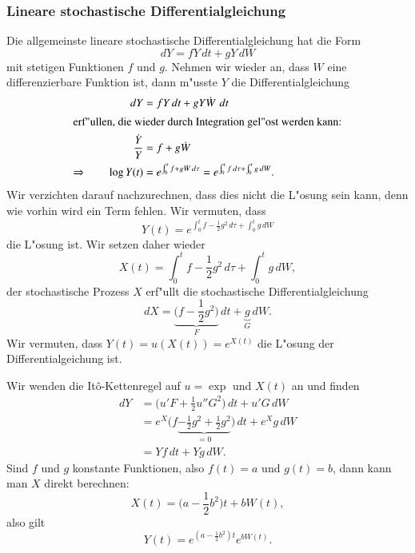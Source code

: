 \subsubsection{Lineare stochastische Differentialgleichung}
Die allgemeinste lineare stochastische Differentialgleichung hat die Form
\begin{equation}
dY=fY\,dt+gY\,dW
\label{stochastisch:beispiel2-dgl}
\end{equation}
mit stetigen Funktionen $f$ und $g$.
Nehmen wir wieder an, dass $W$ eine differenzierbare Funktion ist,
dann m"usste $Y$ die Differentialgleichung
\begin{align*}
dY&=fY\,dt + gY\dot W\,\,dt
\\
\intertext{erf"ullen, die wieder durch Integration gel"ost werden kann:}
\frac{\dot Y}{Y}
&=
f+g\dot W
\\
\Rightarrow\qquad
\log Y(t)
&=
e^{\int_0^t f+g\dot W\,d\tau}
=
e^{\int_0^t f\,d\tau+ \int_0^t g\,dW}.
\end{align*}
Wir verzichten darauf nachzurechnen, dass dies nicht die L"osung sein kann,
denn wie vorhin wird ein Term fehlen.
Wir vermuten, dass
\begin{equation}
Y(t)
=
e^{\int_0^t f -\frac12g^2\,d\tau + \int_0^t g\,dW}
\label{stochastisch:beispiel2-lsg}
\end{equation}
die L"osung ist.
Wir setzen daher wieder
\[
X(t)=\int_0^t f-\frac12g^2\,d\tau + \int_0^tg\,dW,
\]
der stochastische Prozess $X$ erf"ullt die stochastische Differentialgleichung
\[
dX=
\underbrace{\biggl( f-\frac12g^2\biggr)}_{\textstyle F}\,dt
+
\underbrace{g}_{\textstyle G}\,dW.
\]
Wir vermuten, dass $Y(t)=u(X(t))=e^{X(t)}$ die L"osung der
Differentialgeichung ist.

Wir wenden die It\^o-Kettenregel auf $u=\exp$ und $X(t)$ an und finden
\begin{align*}
dY
&=
\biggl(u'F+\frac12u''G^2\biggr)\,dt + u'G\,dW
\\
&=
e^X\biggl( f\underbrace{-\frac12g^2+\frac12 g^2}_{\textstyle=0}\biggr)\,dt
+
e^Xg\,dW
\\
&=
Yf\,dt + Yg\,dW.
\end{align*}
Sind $f$ und $g$ konstante Funktionen, also $f(t)=a$ und $g(t)=b$, dann
kann man $X$ direkt berechnen:
\[
X(t)=\biggl(a-\frac12b^2\biggr)t + bW(t),
\]
also gilt
\[
Y(t)=e^{(a-\frac12b^2)t} e^{bW(t)}.
\]

